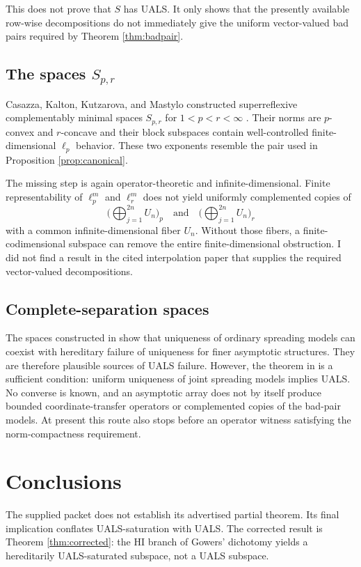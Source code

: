 \documentclass[11pt]{article}
\theoremstyle{definition}
\theoremstyle{remark}
\begin{document}
This does not prove that $S$ has UALS.  It only shows that the presently available row-wise decompositions do not immediately give the uniform vector-valued bad pairs required by Theorem \ref{thm:badpair}.

\subsection{The spaces $S_{p,r}$}

Casazza, Kalton, Kutzarova, and Mastylo constructed superreflexive complementably minimal spaces $S_{p,r}$ for $1<p<r<\infty$ \cite{CKKM}.  Their norms are $p$-convex and $r$-concave and their block subspaces contain well-controlled finite-dimensional $\ell_p$ behavior.  These two exponents resemble the pair used in Proposition \ref{prop:canonical}.

The missing step is again operator-theoretic and infinite-dimensional.  Finite representability of $\ell_p^m$ and $\ell_r^m$ does not yield uniformly complemented copies of
\[
  \Big(\bigoplus_{j=1}^{2n}U_n\Big)_p
  \quad\text{and}\quad
  \Big(\bigoplus_{j=1}^{2n}U_n\Big)_r
\]
with a common infinite-dimensional fiber $U_n$.  Without those fibers, a finite-codimensional subspace can remove the entire finite-dimensional obstruction.  I did not find a result in the cited interpolation paper that supplies the required vector-valued decompositions.

\subsection{Complete-separation spaces}

The spaces constructed in \cite{AM,AGM,GMS} show that uniqueness of ordinary spreading models can coexist with hereditary failure of uniqueness for finer asymptotic structures.  They are therefore plausible sources of UALS failure.  However, the theorem in \cite{AGLM} is a sufficient condition: uniform uniqueness of joint spreading models implies UALS.  No converse is known, and an asymptotic array does not by itself produce bounded coordinate-transfer operators or complemented copies of the bad-pair models.  At present this route also stops before an operator witness satisfying the norm-compactness requirement.

\section{Conclusions}

The supplied packet does not establish its advertised partial theorem.  Its final implication conflates UALS-saturation with UALS.  The corrected result is Theorem \ref{thm:corrected}: the HI branch of Gowers' dichotomy yields a hereditarily UALS-saturated subspace, not a UALS subspace.
\end{document}
